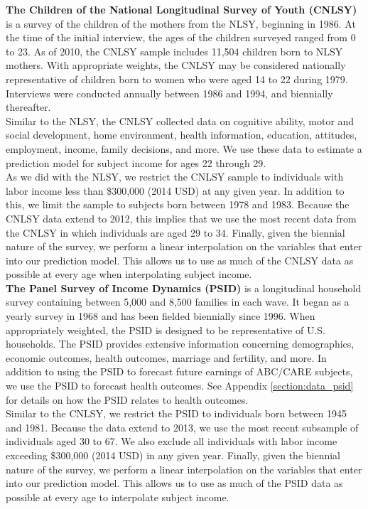 \noindent \textbf{The Children of the National Longitudinal Survey of Youth (CNLSY)} is a survey of the children of the mothers from the NLSY, beginning in 1986. At the time of the initial interview, the ages of the children surveyed ranged from 0 to 23. As of 2010, the CNLSY sample includes 11,504 children born to NLSY mothers. With appropriate weights, the CNLSY may be considered nationally representative of children born to women who were aged 14 to 22 during 1979. Interviews were conducted annually between 1986 and 1994, and biennially thereafter. \\

\noindent Similar to the NLSY, the CNLSY collected data on cognitive ability, motor and social development, home environment, health information, education, attitudes, employment, income, family decisions, and more. We use these data to estimate a prediction model for subject income for ages 22 through 29. \\

\noindent As we did with the NLSY, we restrict the CNLSY sample to individuals with labor income less than \$300,000 (2014 USD) at any given year. In addition to this, we limit the sample to subjects born between 1978 and 1983. Because the CNLSY data extend to 2012, this implies that we use the most recent data from the CNLSY in which individuals are aged 29 to 34. Finally, given the biennial nature of the survey, we perform a linear interpolation on the variables that enter into our prediction model. This allows us to use as much of the CNLSY data as possible at every age when interpolating subject income. \\

\noindent \textbf{The Panel Survey of Income Dynamics (PSID)} is a longitudinal household survey containing between 5,000 and 8,500 families in each wave. It began as a yearly survey in 1968 and has been fielded biennially since 1996. When appropriately weighted, the PSID is designed to be representative of U.S. households. The PSID provides extensive information concerning demographics, economic outcomes, health outcomes, marriage and fertility, and more. In addition to using the PSID to forecast future earnings of ABC/CARE subjects, we use the PSID to forecast health outcomes. See Appendix \ref{section:data_psid} for details on how the PSID relates to health outcomes. \\

\noindent Similar to the CNLSY, we restrict the PSID to individuals born between 1945 and 1981. Because the data extend to 2013, we use the most recent subsample of individuals aged 30 to 67. We also exclude all individuals with labor income exceeding \$300,000 (2014 USD) in any given year. Finally, given the biennial nature of the survey, we perform a linear interpolation on the variables that enter into our prediction model. This allows us to use as much of the PSID data as possible at every age to interpolate subject income. \\

